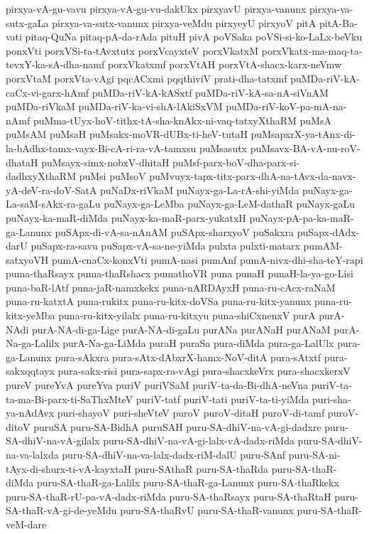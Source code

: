 {pirxya-vA-gu-vavu
pirxya-vA-gu-vu-dakUkx
pirxyavU
pirxya-vanunx
pirxya-va-sutx-gaLa
pirxya-va-sutx-vanunx
pirxya-veMdu
pirxyeyU
pirxyoV
pitA
pitA-Ba-vati
pitaq-QuNa
pitaq-pA-da-rAda
pituH
pivA
poVSaka
poVSi-si-ko-LaLx-beVku
ponxVti
porxVSi-ta-tAvxtutx
porxVcayxteV
porxVkatxM
porxVkatx-ma-maq-ta-tevxY-ka-sA-dha-namf
porxVkatxmf
porxVtAH
porxVtA-shacx-karx-neVmw
porxVtaM
porxVta-vAgi
pqcACxmi
pqqthiviV
prati-dha-tatxmf
puMDa-riV-kA-caCx-vi-garx-hAmf
puMDa-riV-kA-kASxtf
puMDa-riV-kA-sa-nA-siVnAM
puMDa-riVkaM
puMDa-riV-ka-vi-shA-lAkiSxVM
puMDa-riV-koV-pa-mA-na-nAmf
puMma-tUyx-hoV-tithx-tA-sha-knAkx-ni-vaq-tatxyXthaRM
puMsA
puMsAM
puMsaH
puMsakx-moVR-dUBx-ti-heV-tutaH
puMsapxrX-ya-tAnx-di-la-bAdhx-tamx-vayx-Bi-cA-ri-ra-vA-tamxsu
puMsasutx
puMsavx-BA-vA-nu-roV-dhataH
puMsayx-simx-nobxV-dhitaH
puMsf-parx-boV-dha-parx-si-dadhxyXthaRM
puMsi
puMsoV
puMvuyx-tapx-titx-parx-dhA-na-tAvx-da-navx-yA-deV-ra-doV-SatA
puNaDx-riVkaM
puNayx-ga-La-rA-shi-yiMda
puNayx-ga-La-saM-sAkx-ra-gaLu
puNayx-ga-LeMba
puNayx-ga-LeM-dathaR
puNayx-gaLu
puNayx-ka-maR-diMda
puNayx-ka-maR-parx-yukatxH
puNayx-pA-pa-ka-maR-ga-Lanunx
puSApx-di-vA-sa-nAnAM
puSApx-sharxyoV
puSakxra
puSapx-dAdx-darU
puSapx-ra-savu
puSapx-vA-sa-ne-yiMda
pulxta
pulxti-matarx
pumAM-satxyoVH
pumA-cnaCx-konxVti
pumA-nasi
pumAnf
pumA-nivx-dhi-sha-teY-rapi
puma-thaRsayx
puma-thaRshacx
pumathoVR
puna
punaH
punaH-la-ya-go-Lisi
puna-baR-lAtf
puna-jaR-namxkekx
puna-nARDAyxH
puna-ru-cAcx-raNaM
puna-ru-katxtA
puna-rukitx
puna-ru-kitx-doVSa
puna-ru-kitx-yanunx
puna-ru-kitx-yeMba
puna-ru-kitx-yilalx
puna-ru-kitxyu
puna-shiCxnenxV
purA
purA-NAdi
purA-NA-di-ga-Lige
purA-NA-di-gaLu
purANa
purANaH
purANaM
purA-Na-ga-Lalilx
purA-Na-ga-LiMda
puraH
puraSa
pura-diMda
pura-ga-LalUlx
pura-ga-Lanunx
pura-sAkxra
pura-sAtx-dAbxrX-hamx-NoV-ditA
pura-sAtxtf
pura-sakxqqtayx
pura-sakx-risi
pura-sapx-ra-vAgi
pura-shacxkeVrx
pura-shacxkerxV
pureV
pureYvA
pureYva
puriV
puriVSaM
puriV-ta-da-Bi-dhA-neVna
puriV-ta-ta-ma-Bi-parx-ti-SaThxMteV
puriV-tatf
puriV-tati
puriV-ta-ti-yiMda
puri-sha-ya-nAdAvx
puri-shayoV
puri-sheVteV
puroV
puroV-ditaH
puroV-di-tamf
puroV-ditoV
puruSA
puru-SA-BidhA
puruSAH
puru-SA-dhiV-na-vA-gi-dadxre
puru-SA-dhiV-na-vA-gilalx
puru-SA-dhiV-na-vA-gi-lalx-vA-dadx-riMda
puru-SA-dhiV-na-va-lalxda
puru-SA-dhiV-na-va-lalx-dadx-riM-dalU
puru-SAnf
puru-SA-ni-tAyx-di-shurx-ti-vA-kayxtaH
puru-SAthaR
puru-SA-thaRda
puru-SA-thaR-diMda
puru-SA-thaR-ga-Lalilx
puru-SA-thaR-ga-Lanunx
puru-SA-thaRkekx
puru-SA-thaR-rU-pa-vA-dadx-riMda
puru-SA-thaRsayx
puru-SA-thaRtaH
puru-SA-thaR-vA-gi-de-yeMdu
puru-SA-thaRvU
puru-SA-thaR-vanunx
puru-SA-thaR-veM-dare
}
